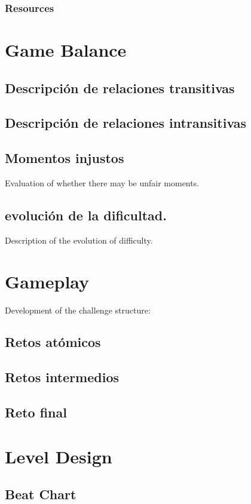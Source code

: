         \subsubsection{Resources}

\section{Game Balance}
    \subsection{Descripción de relaciones transitivas}
    \subsection{Descripción de relaciones intransitivas}
    \subsection{Momentos injustos}
    Evaluation of whether there may be unfair moments.
    \subsection{ evolución de la dificultad.}
    Description of the evolution of difficulty.

\section{Gameplay}
Development of the challenge structure:
    \subsection{Retos atómicos}
    \subsection{Retos intermedios }
    \subsection{Reto final}

\section{Level Design} \label{levelDesign}
    \subsection{Beat Chart}

